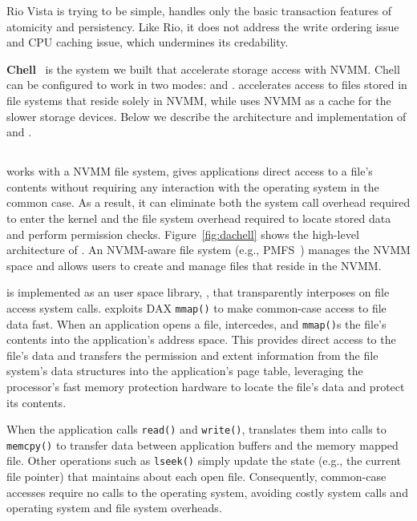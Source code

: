 Rio Vista is trying to be simple, handles only the basic transaction features
of atomicity and persistency. Like Rio, it does not address the write ordering
issue and CPU caching issue, which undermines its credability. 

\textbf{Chell}~\cite{Chell} is the system we built that accelerate storage
access with NVMM. Chell can be configured to work in two modes: \DAChell{}
and \CChell{}. \DAChell{} accelerates access to files stored in file systems
that reside solely in NVMM, while \CChell{} uses NVMM as a cache for the
slower storage devices. Below we describe the architecture and implementation
of \DAChell{} and \CChell{}.

\subsection{\DAChell{}}



\DAChell{} works with a NVMM file system, gives applications direct access to
a file's contents without
requiring any interaction with the operating system in the common case.  As a
result, it can eliminate both the system call overhead required to enter the
kernel and the file system overhead required to locate stored data and perform
permission checks.
Figure~\ref{fig:dachell} shows the high-level architecture of
\DAChell{}. An NVMM-aware file system (e.g.,
PMFS~\cite{PMFS}) manages the NVMM space and allows users to create and manage
files that reside in the NVMM.

\DAChell{} is implemented as an user space library, \libd{}, that transparently interposes on file access system calls.
\DAChell{} exploits DAX \texttt{mmap()} to make common-case access to file data
fast.  When an application opens a file, \DAChell{} intercedes, and
\texttt{mmap()}s the file's contents into the application's address space.
This provides direct access to the file's data and transfers the permission and
extent information from the file system's data structures into the
application's page table, leveraging the processor's fast memory
protection hardware to locate the file's data and protect its contents.

When the application calls \texttt{read()} and \texttt{write()}, \DAChell{}
translates them into calls to \texttt{memcpy()} to transfer data between
application buffers and the memory mapped file.  Other operations such as
\texttt{lseek()} simply update the state (e.g., the current file pointer) that
\DAChell{} maintains about each open file.  Consequently, common-case accesses
require no calls to the operating system, avoiding costly system calls and 
operating system and file system overheads.

